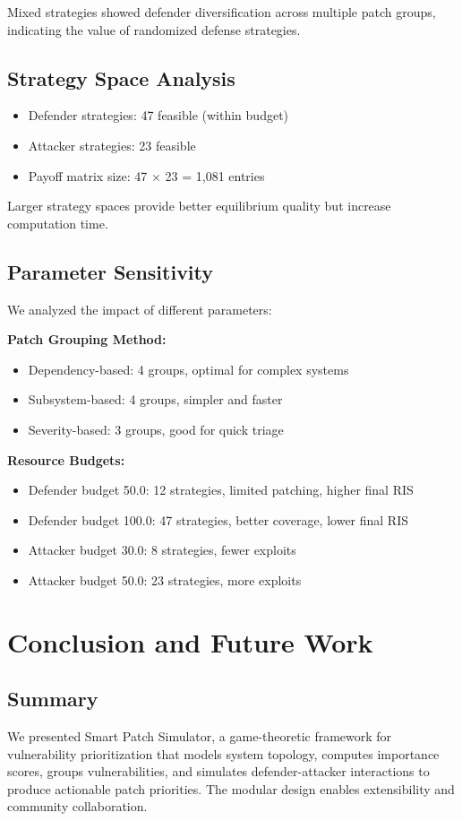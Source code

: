 \documentclass[conference]{IEEEtran}
\begin{document}
Mixed strategies showed defender diversification across multiple patch groups, indicating the value of randomized defense strategies.

\subsection{Strategy Space Analysis}
\begin{itemize}
    \item Defender strategies: 47 feasible (within budget)
    \item Attacker strategies: 23 feasible
    \item Payoff matrix size: 47 $\times$ 23 = 1,081 entries
\end{itemize}

Larger strategy spaces provide better equilibrium quality but increase computation time.

\subsection{Parameter Sensitivity}
We analyzed the impact of different parameters:

\textbf{Patch Grouping Method:}
\begin{itemize}
    \item Dependency-based: 4 groups, optimal for complex systems
    \item Subsystem-based: 4 groups, simpler and faster
    \item Severity-based: 3 groups, good for quick triage
\end{itemize}

\textbf{Resource Budgets:}
\begin{itemize}
    \item Defender budget 50.0: 12 strategies, limited patching, higher final RIS
    \item Defender budget 100.0: 47 strategies, better coverage, lower final RIS
    \item Attacker budget 30.0: 8 strategies, fewer exploits
    \item Attacker budget 50.0: 23 strategies, more exploits
\end{itemize}

\section{Conclusion and Future Work}

\subsection{Summary}
We presented Smart Patch Simulator, a game-theoretic framework for vulnerability prioritization that models system topology, computes importance scores, groups vulnerabilities, and simulates defender-attacker interactions to produce actionable patch priorities. The modular design enables extensibility and community collaboration.
\end{document}
